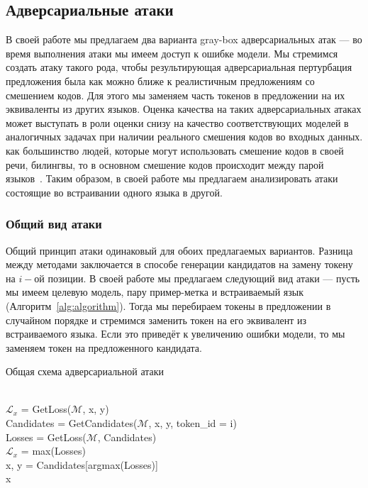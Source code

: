 \subsection{Адверсариальные атаки}
В своей работе мы предлагаем два варианта gray-box адверсариальных атак — во время выполнения атаки мы имеем доступ к ошибке модели.
Мы стремимся создать атаку такого рода, чтобы результирующая адверсариальная пертурбация предложения была как можно ближе к реалистичным предложениям со смешением кодов.
Для этого мы заменяем часть токенов в предложении на их эквиваленты из других языков.
Оценка качества на таких адверсариальных атаках может выступать в роли оценки снизу на качество соответствующих моделей в аналогичных задачах при наличии реального смешения кодов во входных данных.
 как большинство людей, которые могут использовать смешение кодов в своей речи, билингвы, то в основном смешение кодов происходит между парой языков~\cite{bilinguals}.
Таким образом, в своей работе мы предлагаем анализировать атаки состоящие во встраивании одного языка в другой.

\subsubsection{Общий вид атаки}
Общий принцип атаки одинаковый для обоих предлагаемых вариантов.
Разница между методами заключается в способе генерации кандидатов на замену токену на $i-$ой позиции.
В своей работе мы предлагаем следующий вид атаки — пусть мы имеем целевую модель, пару пример-метка и встраиваемый язык (Алгоритм~\eqref{alg:algorithm}).
Тогда мы перебираем токены в предложении в случайном порядке и стремимся заменить токен на его эквивалент из встраиваемого языка.
Если это приведёт к увеличению ошибки модели, то мы заменяем токен на предложенного кандидата.

\begin{algorithm}
    \caption{Общая схема адверсариальной атаки}
    \begin{algorithmic}
         \\
        $\mathcal{L}_{x}$ = GetLoss($\mathcal{M}$, x, y)
            \\
            \ind Candidates = GetCandidates($\mathcal{M}$, x, y, token\_id = i) \\
            \ind Losses = GetLoss($\mathcal{M}$, Candidates)
            \ind{}
                    \\
                    \ind\ind$\mathcal{L}_{x}$ = max(Losses) \\
                    \ind\ind x, y = Candidates[argmax(Losses)]
            \EndIf
        \EndFor \\
        \ind\Return x
    \end{algorithmic}\label{alg:algorithm}
\end{algorithm}

